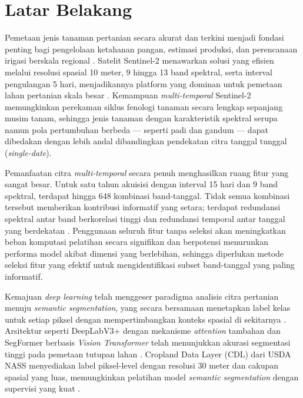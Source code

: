 \section{Latar Belakang}
Pemetaan jenis tanaman pertanian secara akurat dan terkini menjadi fondasi penting bagi pengelolaan ketahanan pangan, estimasi produksi, dan perencanaan irigasi berskala regional \citep{potapov2022, yi2020}.
Satelit Sentinel-2 menawarkan solusi yang efisien melalui resolusi spasial 10 meter, 9 hingga 13 band spektral, serta interval pengulangan 5 hari, menjadikannya platform yang dominan untuk pemetaan lahan pertanian skala besar \citep{phiri2020}.
Kemampuan \textit{multi-temporal} Sentinel-2 memungkinkan perekaman siklus fenologi tanaman secara lengkap sepanjang musim tanam, sehingga jenis tanaman dengan karakteristik spektral serupa namun pola pertumbuhan berbeda — seperti padi dan gandum — dapat dibedakan dengan lebih andal dibandingkan pendekatan citra tanggal tunggal (\textit{single-date}).

Pemanfaatan citra \textit{multi-temporal} secara penuh menghasilkan ruang fitur yang sangat besar.
Untuk satu tahun akuisisi dengan interval 15 hari dan 9 band spektral, terdapat hingga 648 kombinasi band-tanggal.
Tidak semua kombinasi tersebut memberikan kontribusi informatif yang setara; terdapat redundansi spektral antar band berkorelasi tinggi dan redundansi temporal antar tanggal yang berdekatan \citep{li2023}.
Penggunaan seluruh fitur tanpa seleksi akan meningkatkan beban komputasi pelatihan secara signifikan dan berpotensi menurunkan performa model akibat dimensi yang berlebihan, sehingga diperlukan metode seleksi fitur yang efektif untuk mengidentifikasi subset band-tanggal yang paling informatif.

Kemajuan \textit{deep learning} telah menggeser paradigma analisis citra pertanian menuju \textit{semantic segmentation}, yang secara bersamaan menetapkan label kelas untuk setiap piksel dengan mempertimbangkan konteks spasial di sekitarnya \citep{luo2024, ajibola2024}.
Arsitektur seperti DeepLabV3+ dengan mekanisme \textit{attention} tambahan dan SegFormer berbasis \textit{Vision Transformer} telah menunjukkan akurasi segmentasi tinggi pada pemetaan tutupan lahan \citep{chen2018deeplabv3, xie2021, hsu2022}.
Cropland Data Layer (CDL) dari USDA NASS menyediakan label piksel-level dengan resolusi 30 meter dan cakupan spasial yang luas, memungkinkan pelatihan model \textit{semantic segmentation} dengan supervisi yang kuat \citep{maleki2024}.

